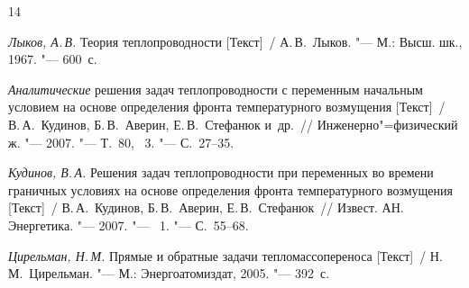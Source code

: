 \begin{thebibliography}{14}
\item {\it Лыков, А.\,В. }
	Теория теплопроводности [Текст]~/
	А.\,В.~Лыков. "--- М.: Высш. шк., 1967. "--- 600~с.


\item {\it Аналитические } решения задач теплопроводности с переменным начальным условием на основе 
определения фронта температурного возмущения [Текст]~/
	В.\,А.~Кудинов, Б.\,В.~Аверин, Е.\,В.~Стефанюк и~др.~/\!/ Инженерно"=физический ж. "--- 2007. "---
	 Т.~80, \No~3. "--- С.~27--35.


\item {\it Кудинов, В.\,А.}
	Решения задач теплопроводности при переменных во времени граничных условиях на основе определения фронта 
	температурного возмущения [Текст]~/
	В.\,А.~Кудинов, Б.\,В.~Аверин, Е.\,В.~Стефанюк~/\!/ Извест. АН. Энергетика. "--- 2007. "--- \No~1.  "---  С.~55--68.

\item {\it Цирельман, Н.\,М.} Прямые и обратные задачи тепломассопереноса [Текст]~/
	Н.\,М.~Цирельман. "--- М.: Энергоатомиздат, 2005. "--- 392~с.

\end{thebibliography}


\makeengtitle




